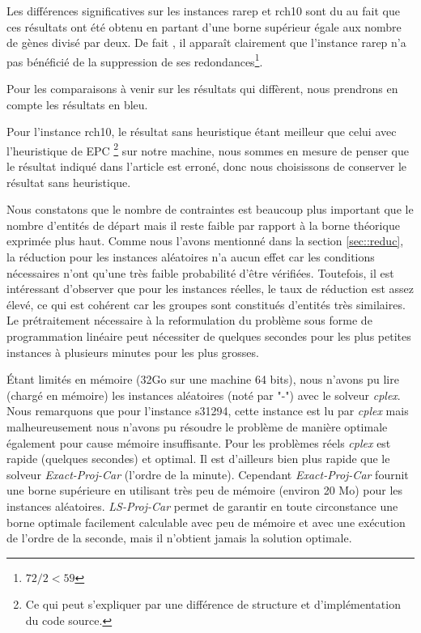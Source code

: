 Les différences significatives sur les instances rarep et rch10 sont du au fait que ces résultats ont été obtenu en partant d'une borne supérieur égale aux nombre de gènes divisé par deux. De fait , il apparaît clairement que l'instance rarep n'a pas bénéficié de la suppression de ses redondances\footnote{$72/2<59$}.

Pour les comparaisons à venir sur les résultats qui diffèrent, nous prendrons en compte les résultats en bleu.

Pour l'instance rch10, le résultat sans heuristique étant meilleur que celui avec l'heuristique de EPC \footnote{Ce qui peut s'expliquer par une différence de structure et d'implémentation du code source.} sur notre machine, nous sommes en mesure de penser que le résultat indiqué dans l'article est erroné, donc nous choisissons de conserver le résultat sans heuristique.


Nous constatons que le nombre de contraintes est beaucoup plus important que le
nombre d'entités de départ mais il reste faible par rapport à la borne théorique
exprimée plus haut. Comme nous l'avons mentionné dans la section \ref{sec::reduc}, la réduction pour les instances aléatoires n'a aucun effet car les conditions nécessaires n'ont qu'une très faible probabilité d'être vérifiées. Toutefois, il est intéressant d'observer que pour les instances réelles, le taux de réduction est assez élevé, ce qui est cohérent car les groupes sont constitués d'entités très similaires.
Le prétraitement nécessaire à la reformulation du problème sous forme de programmation linéaire peut nécessiter de quelques secondes pour les plus petites instances à plusieurs minutes pour les plus grosses.

\'Etant limités en mémoire (32Go sur une machine 64 bits), nous n'avons pu
lire (chargé en mémoire) les instances aléatoires (noté par "-") avec le solveur \emph{cplex}. Nous remarquons que pour l'instance s31294, cette instance est lu par \emph{cplex} mais malheureusement nous n'avons pu résoudre le problème de manière optimale également pour cause mémoire insuffisante.
Pour les problèmes réels \emph{cplex}
est  rapide (quelques secondes) et optimal. Il est d'ailleurs bien plus
rapide que le solveur \emph{Exact-Proj-Car} (l'ordre de la minute).
Cependant \emph{Exact-Proj-Car} fournit une borne supérieure en utilisant très peu de
mémoire (environ 20 Mo) pour les instances aléatoires. \emph{LS-Proj-Car} permet de garantir en toute circonstance une borne optimale facilement calculable avec peu de mémoire et avec une exécution de l'ordre de la seconde, mais il n'obtient jamais la solution optimale.

